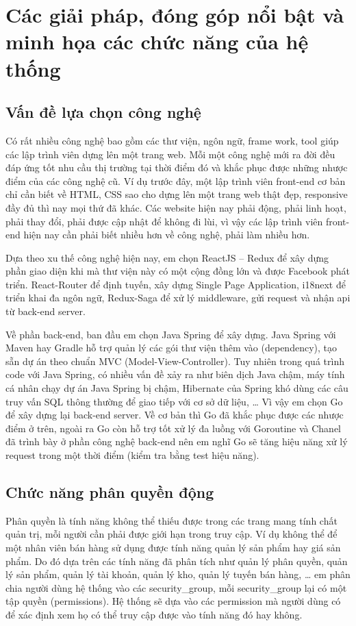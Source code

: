 \chapter{Các giải pháp, đóng góp nổi bật và minh họa các
chức năng của hệ thống}
\section{Vấn đề lựa chọn công nghệ}
Có rất nhiều công nghệ bao gồm các thư viện, ngôn ngữ, frame work,
tool giúp các lập trình viên dựng lên một trang web. Mỗi một công nghệ
mới ra đời đều đáp ứng tốt nhu cầu thị trường tại thời điểm đó và
khắc phục được những nhược điểm của các công nghệ cũ. Ví dụ trước đây,
một lập trình viên front-end cơ bản chỉ cần biết về HTML, CSS sao cho
dựng lên một trang web thật đẹp, responsive đầy đủ thì nay mọi thứ đã
khác. Các website hiện nay phải động, phải linh hoạt, phải thay đổi,
phải được cập nhật để không đi lùi, vì vậy các lập trình viên front-end
hiện nay cần phải biết nhiều hơn về công nghệ, phải làm nhiều hơn.

Dựa theo xu thế công nghệ hiện nay, em chọn ReactJS – Redux để
xây dựng phần giao diện khi mà thư viện này có một cộng đồng lớn
và được Facebook phát triển. React-Router để định tuyến, xây dựng
Single Page Application, i18next để triển khai đa ngôn ngữ,
Redux-Saga để xử lý middleware, gửi request và nhận api từ back-end server. 

Về phần back-end, ban đầu em chọn Java Spring để xây dựng.
Java Spring với Maven hay Gradle hỗ trợ quản lý các gói thư viện
thêm vào (dependency), tạo sẵn dự án theo chuẩn
MVC (Model-View-Controller). Tuy nhiên trong quá trình code với
Java Spring, có nhiều vấn đề xảy ra như biên dịch Java chậm,
máy tính cá nhân chạy dự án Java Spring bị chậm, Hibernate của
Spring khó dùng các câu truy vấn SQL thông thường để giao tiếp
với cơ sở dữ liệu, … Vì vậy em chọn Go để xây dựng
lại back-end server. Về cơ bản thì Go đã khắc phục được các
nhược điểm ở trên, ngoài ra Go còn hỗ trợ tốt xử lý đa luồng với
Goroutine và Chanel đã trình bày ở phần công nghệ back-end nên
em nghĩ Go sẽ tăng hiệu năng xử lý request trong một thời
điểm (kiểm tra bằng test hiệu năng).

\section{Chức năng phân quyền động}
Phân quyền là tính năng không thể thiếu được trong các trang mang
tính chất quản trị, mỗi người cần phải được giới hạn trong truy cập.
Ví dụ không thể để một nhân viên bán hàng sử dụng được tính năng
quản lý sản phẩm hay giá sản phẩm. Do đó dựa trên các tính năng
đã phân tích như quản lý phân quyền, quản lý sản phẩm, quản lý tài khoản,
quản lý kho, quản lý tuyến bán hàng, … em phân chia người dùng
hệ thống vào các security\_group, mỗi security\_group lại có một tập
quyền (permissions). Hệ thống sẽ dựa vào các permission mà người
dùng có để xác định xem họ có thể truy
cập được vào tính năng đó hay không.


